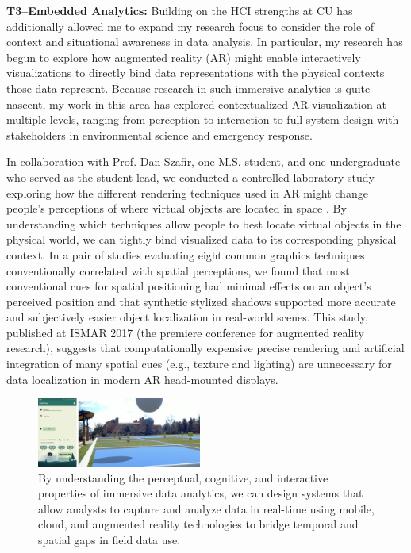 \documentclass[11pt]{article}
\begin{document}
\textbf{T3--Embedded Analytics: }
Building on the HCI strengths at CU has additionally allowed me to expand my research focus to consider the role of context and situational awareness in data analysis. In particular, my research has begun to explore how augmented reality (AR) might enable interactively visualizations to directly bind data representations with the physical contexts those data represent. Because research in such immersive analytics is quite nascent, my work in this area has explored contextualized AR visualization at multiple levels, ranging from perception to interaction to full system design with stakeholders in environmental science and emergency response. 

In collaboration with Prof. Dan Szafir, one M.S. student, and one undergraduate who served as the student lead, we conducted a controlled laboratory study exploring how the different rendering techniques used in AR might change people's perceptions of where virtual objects are located in space \cite{diaz2017Designing}. By understanding which techniques allow people to best locate virtual objects in the physical world, we can tightly bind visualized data to its corresponding physical context. In a pair of studies evaluating eight  common graphics techniques conventionally correlated with spatial perceptions, we found that most conventional cues for spatial positioning had minimal effects on an object's perceived position and that synthetic stylized shadows supported more accurate and subjectively easier object localization in real-world scenes. This study, published at ISMAR 2017 (the premiere conference for augmented reality research), suggests that computationally expensive precise rendering and artificial integration of many spatial cues (e.g., texture and lighting) are unnecessary for data localization in modern AR head-mounted displays. 

\begin{figure}
	\begin{center}
		\includegraphics[width=0.48\textwidth]{fieldview}
	\end{center}
	\caption{By understanding the perceptual, cognitive, and interactive properties of immersive data analytics, we can design systems that allow analysts to capture and analyze data in real-time using mobile, cloud, and augmented reality technologies to bridge temporal and spatial gaps in field data use.}
\end{figure}
 
\end{document}
